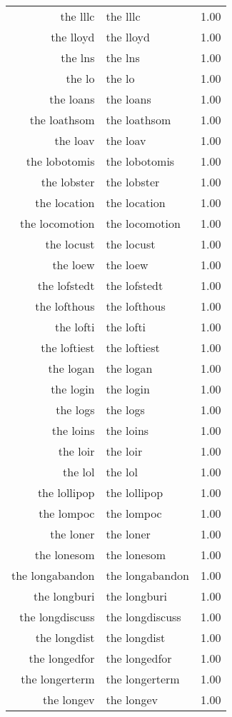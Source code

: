 \begin{table}[ht]
\begin{tabular}{rlr}
  the lllc & the lllc & 1.00 \\ 
  the lloyd & the lloyd & 1.00 \\ 
  the lns & the lns & 1.00 \\ 
  the lo & the lo & 1.00 \\ 
  the loans & the loans & 1.00 \\ 
  the loathsom & the loathsom & 1.00 \\ 
  the loav & the loav & 1.00 \\ 
  the lobotomis & the lobotomis & 1.00 \\ 
  the lobster & the lobster & 1.00 \\ 
  the location & the location & 1.00 \\ 
  the locomotion & the locomotion & 1.00 \\ 
  the locust & the locust & 1.00 \\ 
  the loew & the loew & 1.00 \\ 
  the lofstedt & the lofstedt & 1.00 \\ 
  the lofthous & the lofthous & 1.00 \\ 
  the lofti & the lofti & 1.00 \\ 
  the loftiest & the loftiest & 1.00 \\ 
  the logan & the logan & 1.00 \\ 
  the login & the login & 1.00 \\ 
  the logs & the logs & 1.00 \\ 
  the loins & the loins & 1.00 \\ 
  the loir & the loir & 1.00 \\ 
  the lol & the lol & 1.00 \\ 
  the lollipop & the lollipop & 1.00 \\ 
  the lompoc & the lompoc & 1.00 \\ 
  the loner & the loner & 1.00 \\ 
  the lonesom & the lonesom & 1.00 \\ 
  the longabandon & the longabandon & 1.00 \\ 
  the longburi & the longburi & 1.00 \\ 
  the longdiscuss & the longdiscuss & 1.00 \\ 
  the longdist & the longdist & 1.00 \\ 
  the longedfor & the longedfor & 1.00 \\ 
  the longerterm & the longerterm & 1.00 \\ 
  the longev & the longev & 1.00 \\ 

\end{tabular}
\end{table}
